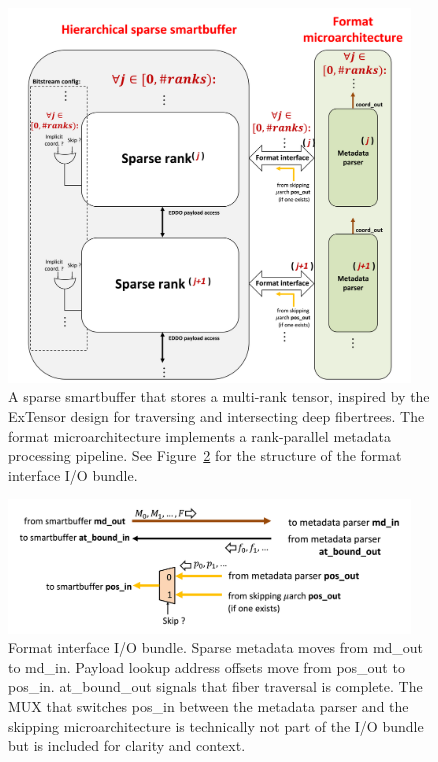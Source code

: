 \begin{figure}[ht]
    \centering
    \includegraphics[width=0.95\textwidth]{figures/hierarchical_general_format_sparse_smartbuffer.png}
    \caption{A sparse smartbuffer that stores a multi-rank tensor, inspired by the ExTensor\cite{extensor} design for traversing and intersecting deep fibertrees. The format microarchitecture implements a rank-parallel metadata processing pipeline. See Figure~\ref{fig:format_interface} for the structure of the format interface I/O bundle.}
    \label{fig:hierarchical_general_format_sparse_smartbuffer}
\end{figure}

\begin{figure}[ht]
    \centering
    \includegraphics[width=0.95\textwidth]{figures/format_interface.png}
    \caption{Format interface I/O bundle. Sparse metadata moves from md\_out to md\_in. Payload lookup address offsets move from pos\_out to pos\_in. at\_bound\_out signals that fiber traversal is complete. The MUX that switches pos\_in between the metadata parser and the skipping microarchitecture is technically not part of the I/O bundle but is included for clarity and context.}
    \label{fig:format_interface}
\end{figure}

